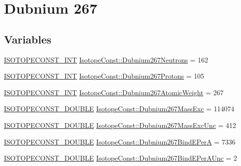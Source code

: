 \hypertarget{group___isotope_const-_dubnium-_db267}{}\section{Dubnium 267}
\label{group___isotope_const-_dubnium-_db267}
\subsection*{Variables}
\begin{DoxyCompactItemize}
\item 
\mbox{\hyperlink{group___isotope_const-_macros_ga5f18360b3e99483a35c32d789e62621c}{I\+S\+O\+T\+O\+P\+E\+C\+O\+N\+S\+T\+\_\+\+I\+NT}} \mbox{\hyperlink{group___isotope_const-_dubnium-_db267_gab4e56055e82b29fcd496819a36593d8d}{Isotope\+Const\+::\+Dubnium267\+Neutrons}} = 162
\item 
\mbox{\hyperlink{group___isotope_const-_macros_ga5f18360b3e99483a35c32d789e62621c}{I\+S\+O\+T\+O\+P\+E\+C\+O\+N\+S\+T\+\_\+\+I\+NT}} \mbox{\hyperlink{group___isotope_const-_dubnium-_db267_gab789586740dce1b38aabec535700af3b}{Isotope\+Const\+::\+Dubnium267\+Protons}} = 105
\item 
\mbox{\hyperlink{group___isotope_const-_macros_ga5f18360b3e99483a35c32d789e62621c}{I\+S\+O\+T\+O\+P\+E\+C\+O\+N\+S\+T\+\_\+\+I\+NT}} \mbox{\hyperlink{group___isotope_const-_dubnium-_db267_ga4eb2ecabf0a512360b8ba94e8392e599}{Isotope\+Const\+::\+Dubnium267\+Atomic\+Weight}} = 267
\item 
\mbox{\hyperlink{group___isotope_const-_macros_ga8f45a7272ce02c0b4c65c44636ed719a}{I\+S\+O\+T\+O\+P\+E\+C\+O\+N\+S\+T\+\_\+\+D\+O\+U\+B\+LE}} \mbox{\hyperlink{group___isotope_const-_dubnium-_db267_ga7fd38a8ca58996b056b71a1d2e3cdb38}{Isotope\+Const\+::\+Dubnium267\+Mass\+Exc}} = 114074
\item 
\mbox{\hyperlink{group___isotope_const-_macros_ga8f45a7272ce02c0b4c65c44636ed719a}{I\+S\+O\+T\+O\+P\+E\+C\+O\+N\+S\+T\+\_\+\+D\+O\+U\+B\+LE}} \mbox{\hyperlink{group___isotope_const-_dubnium-_db267_gad4cf3b018f2bd5d7bee70d825d6aa78c}{Isotope\+Const\+::\+Dubnium267\+Mass\+Exc\+Unc}} = 412
\item 
\mbox{\hyperlink{group___isotope_const-_macros_ga8f45a7272ce02c0b4c65c44636ed719a}{I\+S\+O\+T\+O\+P\+E\+C\+O\+N\+S\+T\+\_\+\+D\+O\+U\+B\+LE}} \mbox{\hyperlink{group___isotope_const-_dubnium-_db267_gae11474d210766ee2884361e28e6054ae}{Isotope\+Const\+::\+Dubnium267\+Bind\+E\+PerA}} = 7336
\item 
\mbox{\hyperlink{group___isotope_const-_macros_ga8f45a7272ce02c0b4c65c44636ed719a}{I\+S\+O\+T\+O\+P\+E\+C\+O\+N\+S\+T\+\_\+\+D\+O\+U\+B\+LE}} \mbox{\hyperlink{group___isotope_const-_dubnium-_db267_gae739b1ed19a9bf71e1e7c33ed84ebbf7}{Isotope\+Const\+::\+Dubnium267\+Bind\+E\+Per\+A\+Unc}} = 2

\end{DoxyCompactItemize}
